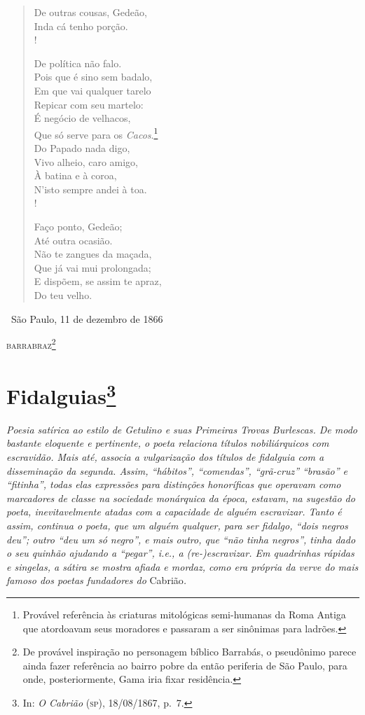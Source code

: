 \begin{verse}
De outras cousas, Gedeão,\\
Inda cá tenho porção.\\!

De política não falo.\\
Pois que é sino sem badalo,\\
Em que vai qualquer tarelo\\
Repicar com seu martelo:\\
É negócio de velhacos,\\
Que só serve para os \emph{Cacos}.\footnote{ Provável referência às
                                criaturas mitológicas semi-humanas da Roma Antiga que atordoavam seus
                                moradores e passaram a ser sinônimas para ladrões.}\\
Do Papado nada digo,\\
Vivo alheio, caro amigo,\\
À batina e à coroa,\\
N'isto sempre andei à toa.\\!

Faço ponto, Gedeão;\\
Até outra ocasião.\\
Não te zangues da maçada,\\
Que já vai mui prolongada;\\
E dispõem, se assim te apraz,\\
Do teu velho.
\end{verse}\medskip

\hfill\ São Paulo, 11 de dezembro de 1866

\hfill\textsc{barrabraz}\footnote{ De provável inspiração no personagem bíblico
  Barrabás, o pseudônimo parece ainda fazer referência ao bairro pobre
  da então periferia de São Paulo, para onde, posteriormente, Gama iria
  fixar residência.}

\chapter{Fidalguias\footnote{In: \emph{O
  Cabrião} (\textsc{sp}), 18/08/1867, p.~7.}}

\begin{didascalia}
\emph{Poesia satírica ao estilo de Getulino e suas Primeiras Trovas
Burlescas. De modo bastante eloquente e pertinente, o poeta relaciona
títulos nobiliárquicos com escravidão. Mais até, associa a vulgarização
dos títulos de fidalguia com a disseminação da segunda. Assim,
``hábitos'', ``comendas'', ``grã-cruz'' ``brasão'' e ``fitinha'', todas elas
expressões para distinções honoríficas que operavam como marcadores de
classe na sociedade monárquica da época, estavam, na sugestão do poeta,
inevitavelmente atadas com a capacidade de alguém escravizar. Tanto é
assim, continua o poeta, que um alguém qualquer, para ser fidalgo, ``dois
negros deu''; outro ``deu um só negro'', e mais outro, que ``não tinha
negros'', tinha dado o seu quinhão ajudando a ``pegar'', i.e., a
(re-)escravizar. Em quadrinhas rápidas e singelas, a sátira se mostra
afiada e mordaz, como era própria da verve do mais famoso dos poetas
fundadores do} Cabrião\emph{.}
\end{didascalia}



